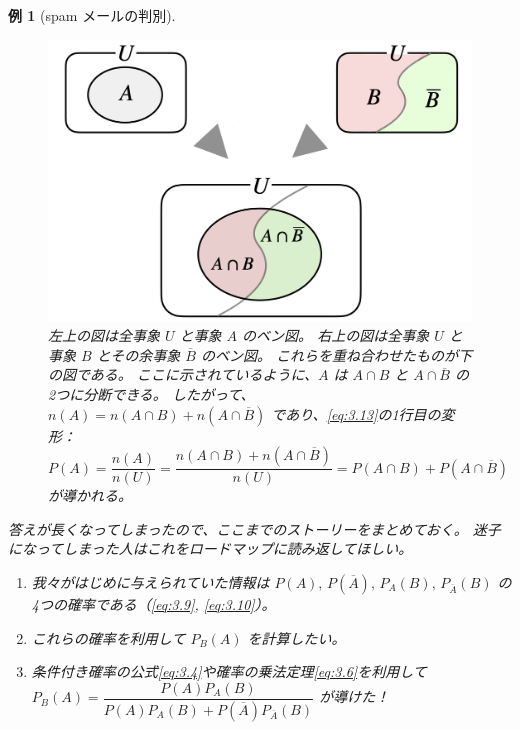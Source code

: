 \documentclass[12pt]{ltjsarticle}\usepackage{ifthen}\newcounter{enlarge}\setcounter{enlarge}{1}
\newtheorem{eg}{例}
\begin{document}
\begin{eg}[spam メールの判別]
  \begin{figure}[] 
    \centering 
    \includegraphics[width=10truecm]{./figure/f3-1.png}
    \captionsetup{width=.9\linewidth}
    \caption{%
      左上の図は全事象 $U$ と事象 $A$ のベン図。
      右上の図は全事象 $U$ と事象 $B$ とその余事象 $\overline{B}$ のベン図。
      これらを重ね合わせたものが下の図である。
      ここに示されているように、$A$ は $A \cap B$ と $A \cap \overline{B}$ の2つに分断できる。
      したがって、$n(A) = n(A \cap B) + n(A \cap \overline{B})$ であり、\eqref{eq:3.13}の1行目の変形：$P(A) = \dfrac{n(A)}{n(U)} = \dfrac{n(A \cap B) + n(A \cap \overline{B})}{n(U)} = P(A \cap B) + P(A \cap \overline{B})$ が導かれる。
    }
    \label{f:3.1}
  \end{figure}

  答えが長くなってしまったので、ここまでのストーリーをまとめておく。
  迷子になってしまった人はこれをロードマップに読み返してほしい。
  \begin{enumerate}
  \item 我々がはじめに与えられていた情報は $P(A),\, P(\overline{A}),\, P_A (B),\, P_{\overline{A}} (B)$ の4つの確率である（\eqref{eq:3.9}, \eqref{eq:3.10}）。
  \item これらの確率を利用して $P_B (A)$ を計算したい。
  \item 条件付き確率の公式\eqref{eq:3.4}や確率の乗法定理\eqref{eq:3.6}を利用して $P_B (A) = \dfrac{P(A) P_A (B)}{P(A) P_A (B) + P(\overline{A}) P_{\overline{A}} (B)}$ が導けた！
  \end{enumerate}
\end{eg}
\end{document}
